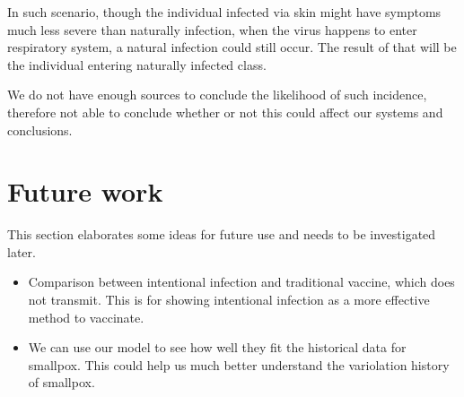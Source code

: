 \documentclass[12pt]{article}
\begin{document}
In such scenario, though the individual infected via skin might have symptoms much less severe than naturally infection, when the virus happens to enter respiratory system, a natural infection could still occur. The result of that will be the individual entering naturally infected class.

We do not have enough sources to conclude the likelihood of such incidence, therefore not able to conclude whether or not this could affect our systems and conclusions.
\section{Future work}
This section elaborates some ideas for future use and needs to be investigated later.
\begin{itemize}
\item Comparison between intentional infection and traditional vaccine, which does not transmit. This is for showing intentional infection as a more effective method to vaccinate.
\item We can use our model to see how well they fit the historical data for smallpox. This could help us much better understand the variolation history of smallpox.
\end{itemize}
\end{document}
